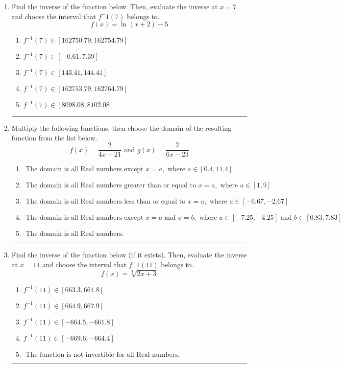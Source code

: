 \documentclass[14pt]{extbook}
\newcommand{\litem}[1]{\item#1\hspace*{-1cm}\rule{\textwidth}{0.4pt}}
\begin{document}
\begin{enumerate}
\litem{
Find the inverse of the function below. Then, evaluate the inverse at $x = 7$ and choose the interval that $f^-1(7)$ belongs to.\[ f(x) = \ln{(x+2)}-5 \]\begin{enumerate}[label=\Alph*.]
\item \( f^{-1}(7) \in [162750.79, 162754.79] \)
\item \( f^{-1}(7) \in [-0.61, 7.39] \)
\item \( f^{-1}(7) \in [143.41, 144.41] \)
\item \( f^{-1}(7) \in [162753.79, 162764.79] \)
\item \( f^{-1}(7) \in [8098.08, 8102.08] \)

\end{enumerate} }
\litem{
Multiply the following functions, then choose the domain of the resulting function from the list below.\[ f(x) = \frac{2}{4x+21} \text{ and } g(x) = \frac{2}{6x-23} \]\begin{enumerate}[label=\Alph*.]
\item \( \text{ The domain is all Real numbers except } x = a, \text{ where } a \in [0.4, 11.4] \)
\item \( \text{ The domain is all Real numbers greater than or equal to } x = a, \text{ where } a \in [1, 9] \)
\item \( \text{ The domain is all Real numbers less than or equal to } x = a, \text{ where } a \in [-6.67, -2.67] \)
\item \( \text{ The domain is all Real numbers except } x = a \text{ and } x = b, \text{ where } a \in [-7.25, -4.25] \text{ and } b \in [0.83, 7.83] \)
\item \( \text{ The domain is all Real numbers. } \)

\end{enumerate} }
\litem{
Find the inverse of the function below (if it exists). Then, evaluate the inverse at $x = 11$ and choose the interval that $f^-1(11)$ belongs to.\[ f(x) = \sqrt[3]{2 x + 3} \]\begin{enumerate}[label=\Alph*.]
\item \( f^{-1}(11) \in [663.3, 664.8] \)
\item \( f^{-1}(11) \in [664.9, 667.9] \)
\item \( f^{-1}(11) \in [-664.5, -661.8] \)
\item \( f^{-1}(11) \in [-669.6, -664.4] \)
\item \( \text{ The function is not invertible for all Real numbers. } \)


\end{enumerate}}
\end{enumerate}
\end{document}
